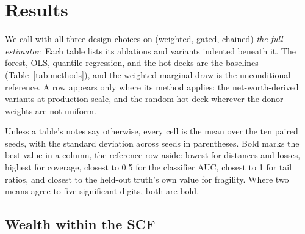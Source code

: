 \section{Results}
\label{sec:results}



We call \populacefit{} with all three design choices on (weighted, gated,
chained) \emph{the full estimator}. Each table lists its ablations and
variants indented beneath it. The \microimpute{} forest, OLS, quantile
regression, and the hot decks are the baselines (Table~\ref{tab:methods}),
and the weighted marginal draw is the unconditional reference. A row appears
only where its method applies: the net-worth-derived variants at production
scale, and the random hot deck wherever the donor weights are not uniform.

Unless a table's notes say otherwise, every cell is the mean over the ten
paired seeds, with the standard deviation across seeds in parentheses. Bold
marks the best value in a column, the reference row aside: lowest for
distances and losses, highest for coverage, closest to 0.5 for the
classifier AUC, closest to 1 for tail ratios, and closest to the held-out
truth's own value for fragility. Where two means agree to five significant
digits, both are bold.

\subsection{Wealth within the SCF}
\label{sec:results-scf}


